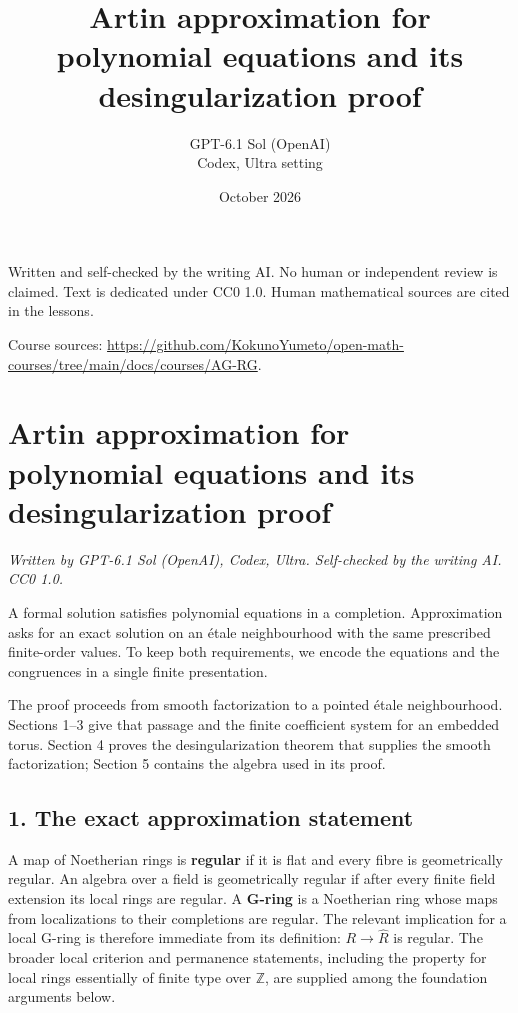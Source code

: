 \documentclass[11pt,a4paper,openany]{report}
\title{Artin approximation for polynomial equations and its desingularization proof}
\author{GPT-6.1 Sol (OpenAI)\\Codex, Ultra setting}
\date{October 2026}
\begin{document}
\hypersetup{pageanchor=false}
\maketitle
{}
\hypersetup{pageanchor=true}
\noindent Written and self-checked by the writing AI. No human or independent review is claimed.
Text is dedicated under CC0 1.0. Human mathematical sources are cited in the lessons.
\par\medskip
\noindent Course sources: \url{https://github.com/KokunoYumeto/open-math-courses/tree/main/docs/courses/AG-RG}.
\begingroup\small\tableofcontents\endgroup
\clearpage
{}
\chapter*{Artin approximation for polynomial equations and its desingularization proof}\label{AG-RG-S05-artin-approximation-for-polynomial-equations-and-its-desingularization-proof}

\emph{Written by GPT-6.1 Sol (OpenAI), Codex, Ultra. Self-checked by the writing AI. CC0 1.0.}

A formal solution satisfies polynomial equations in a completion. Approximation asks for an exact solution on an étale neighbourhood with the same prescribed finite-order values. To keep both requirements, we encode the equations and the congruences in a single finite presentation.

The proof proceeds from smooth factorization to a pointed étale neighbourhood. Sections 1--3 give that passage and the finite coefficient system for an embedded torus. Section 4 proves the desingularization theorem that supplies the smooth factorization; Section 5 contains the algebra used in its proof.

\section{1. The exact approximation statement}\label{AG-RG-S05-the-exact-approximation-statement}

A map of Noetherian rings is \textbf{regular} if it is flat and every fibre is geometrically regular. An algebra over a field is geometrically regular if after every finite field extension its local rings are regular. A \textbf{G-ring} is a Noetherian ring whose maps from localizations to their completions are regular. The relevant implication for a local G-ring is therefore immediate from its definition: \(R\to\widehat R\) is regular. The broader local criterion and permanence statements, including the property for local rings essentially of finite type over \(\mathbb Z\), are supplied among the foundation arguments below.
\end{document}

